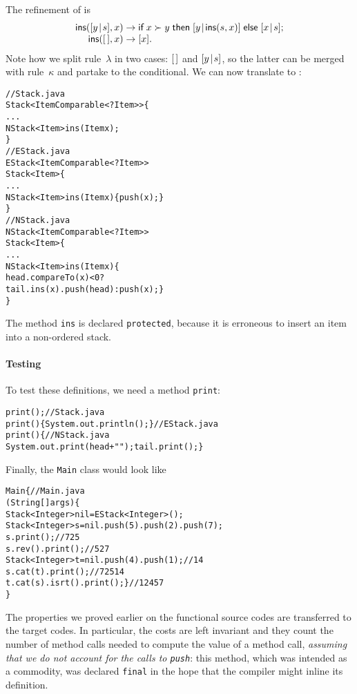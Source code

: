 The refinement of  is
\begin{equation*}
\begin{array}{@{}r@{\;}l@{\;}l@{}}
\fun{ins}(\cons{y}{s},x) & \rightarrow & \fun{if} \; x \succ y \;
\fun{then} \; \cons{y}{\fun{ins}(s,x)} \; \fun{else} \; \cons{x}{s};\\
\fun{ins}(\el,x) & \rightarrow & [x].
\end{array}
\end{equation*}
Note how we split rule~\(\lambda\) in two cases: \([\,]\) and
\([{y}\!\mid\!{s}]\), so the latter can be merged with rule~\(\kappa\) and
partake to the conditional. We can now translate to \Java:
\begin{alltt}
// Stack.java
\public \abstractX
\class Stack<Item \extends Comparable<? \super Item>> \{
  ...
  \protectedX \abstractX NStack<Item> ins(\final Item x);
\}
// EStack.java
\public \class EStack<Item \extends Comparable<? \super Item>>
       \extends Stack<Item> \{
  ...
  \protectedX NStack<Item> ins(\final Item x) \{\return push(x);\}
\}
// NStack.java
\public \class NStack<Item \extends Comparable<? \super Item>>
       \extends Stack<Item> \{
  ...
  \protectedX NStack<Item> ins(\final Item x) \{
    \return head.compareTo(x) < 0 ?
           tail.ins(x).push(head) : push(x); \}
\}
\end{alltt}
The method \texttt{ins} is declared \texttt{protected}, because it is
erroneous to insert an item into a non\hyp{}ordered stack.

\paragraph{Testing}

To test these definitions, we need a method \texttt{print}:
\begin{alltt}
\public \abstractX \void print();\hfill// Stack.java
\public \void print() \{ System.out.println(); \}\hfill// EStack.java
\public \void print() \{\hfill// NStack.java
  System.out.print(head + " "); tail.print(); \}
\end{alltt}
Finally, the \texttt{Main} class would look like
\begin{alltt}
\public \class Main \{\hfill // Main.java
  \public \static \void \main (String[] args) \{
    Stack<Integer> nil = \new EStack<Integer>();
    Stack<Integer> s = nil.push(5).push(2).push(7);
    s.print();\hfill// 7 2 5
    s.rev().print();\hfill// 5 2 7
    Stack<Integer> t = nil.push(4).push(1);\hfill// 1 4
    s.cat(t).print();\hfill// 7 2 5 1 4
    t.cat(s).isrt().print(); \}\hfill// 1 2 4 5 7
\}
\end{alltt}
The properties we proved earlier on the functional source codes are
transferred to the \Java target codes. In particular, the costs are
left invariant and they count the number of method calls needed to
compute the value of a method call, \emph{assuming that we do not
  account for the calls to \texttt{push}}: this method, which was
intended as a commodity, was declared \texttt{final} in the hope that
the compiler might inline its definition.  

